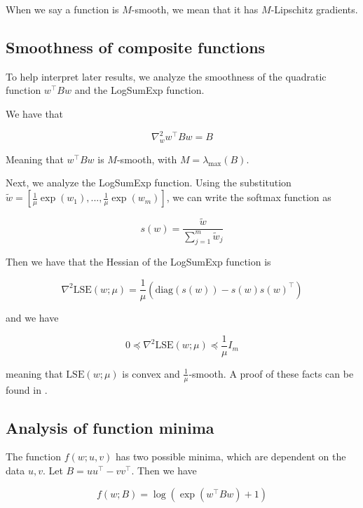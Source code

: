 \documentclass[11pt]{article}
\begin{document}
When we say a function is $M$-smooth, we mean that it has $M$-Lipschitz gradients.

\subsection{Smoothness of composite functions}
\label{sec:composite_smoothness}

To help interpret later results, we analyze the smoothness of the quadratic function $w^{\top}Bw$ and the LogSumExp function.

We have that

\begin{equation}
    \nabla_w^2 w^{\top}Bw = B
\end{equation}

Meaning that $w^{\top}Bw$ is $M$-smooth, with $M = \lambda_{\max}(B)$.

Next, we analyze the LogSumExp function. Using the substitution $\tilde{w} = [\frac{1}{\mu}\exp(w_1), ..., \frac{1}{\mu}\exp(w_m)]$, we can write the softmax function as

\begin{equation}
    s(w) = \frac{\tilde{w}}{\sum_{j=1}^{m} \tilde{w}_j}
\end{equation}

Then we have that the Hessian of the LogSumExp function is

\begin{equation}
    \nabla^2 \textrm{LSE}(w; \mu) = \frac{1}{\mu} (\textrm{diag}(s(w)) - s(w)s(w)^{\top}) 
\end{equation}

and we have

\begin{equation}
    0 \preceq \nabla^2 \textrm{LSE}(w; \mu) \preceq \frac{1}{\mu} I_m
\end{equation}

meaning that $\textrm{LSE}(w; \mu)$ is convex and $\frac{1}{\mu}$-smooth. A proof of these facts can be found in \cite{gao_properties_2018}.

\subsection{Analysis of function minima}

The function $f(w; u, v)$ has two possible minima, which are dependent on the data $u, v$. Let $B = uu^{\top} - vv^{\top}$. Then we have

\begin{equation}
    f(w; B) = \log(\exp(w^{\top}Bw) + 1)
\end{equation}
\end{document}
